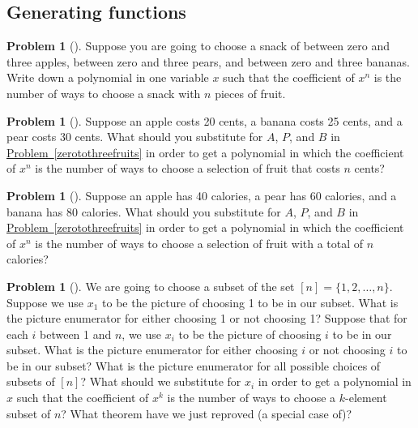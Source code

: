 \documentclass[10pt,]{book}
\theoremstyle{plain}
\theoremstyle{definition}
\newtheorem{activity}[project]{Problem}
\theoremstyle{definition}
\numberwithin{equation}{chapter}
\begin{document}
\subsection[{Generating functions}]{Generating functions}\label{subsection-42}
\begin{activity}[] \label{activity-183}
Suppose you are going to choose a snack of between zero and three apples, between zero and three pears, and between zero and three bananas. Write down a polynomial in one variable \(x\) such that the coefficient of \(x^n\) is the number of ways to choose a snack with \(n\) pieces of fruit.%
\end{activity}
\begin{activity}[] \label{activity-184}
Suppose an apple costs 20 cents, a banana costs 25 cents, and a pear costs 30 cents. What should you substitute for \(A\), \(P\), and \(B\) in \hyperref[zerotothreefruits]{Problem~\ref{zerotothreefruits}} in order to get a polynomial in which the coefficient of \(x^n\) is the number of ways to choose a selection of fruit that costs \(n\) cents?%
\end{activity}
\begin{activity}[] \label{activity-185}
Suppose an apple has 40 calories, a pear has 60 calories, and a banana has 80 calories. What should you substitute for \(A\), \(P\), and \(B\) in \hyperref[zerotothreefruits]{Problem~\ref{zerotothreefruits}} in order to get a polynomial in which the coefficient of \(x^n\) is the number of ways to choose a selection of fruit with a total of \(n\) calories?%
\end{activity}
\begin{activity}[] \label{reprovingbinomialtheorem}
We are going to choose a subset of the set \([n]=\{1,2,\ldots, n\}\). Suppose we use \(x_1\) to be the picture of choosing 1 to be in our subset. What is the picture enumerator for either choosing 1 or not choosing 1? Suppose that for each \(i\) between 1 and \(n\), we use \(x_i\) to be the picture of choosing \(i\) to be in our subset. What is the picture enumerator for either choosing \(i\) or not choosing \(i\) to be in our subset? What is the picture enumerator for all possible choices of subsets of \([n]\)? What should we substitute for \(x_i\) in order to get a polynomial in \(x\) such that the coefficient of \(x^k\) is the number of ways to choose a \(k\)-element subset of \(n\)? What theorem have we just reproved (a special case of)?%
\end{activity}
\end{document}
